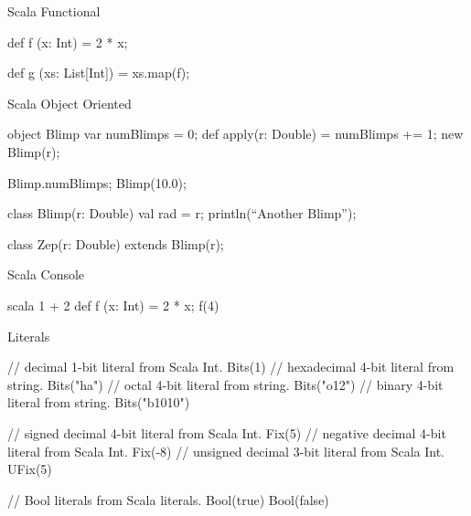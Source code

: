 \documentclass[xcolor=pdflatex,dvipsnames,table]{beamer}
\newenvironment{FramedVerb}%
{\VerbatimEnvironment
\begin{Sbox}\begin{minipage}{.94\textwidth}\begin{Verbatim}}%
{\end{Verbatim}\end{minipage}\end{Sbox}
\setlength{\fboxsep}{8pt}\fbox{\TheSbox}}
\begin{document}
\begin{frame}[fragile]{Scala Functional}

\begin{scala}
def f (x: Int) = 2 * x;

def g (xs: List[Int]) =  xs.map(f);
\end{scala}
\end{frame}

\begin{frame}{Scala Object Oriented}

\begin{scala}
object Blimp {
  var numBlimps = 0;
  def apply(r: Double) = {
    numBlimps += 1;
    new Blimp(r);
  }
}

Blimp.numBlimps;
Blimp(10.0);

class Blimp(r: Double) {
  val rad = r;
  println(“Another Blimp”);
}

class Zep(r: Double) extends Blimp(r);
\end{scala}

\end{frame}

\begin{frame}[fragile]{Scala Console}
\begin{scala}
scala
1 + 2
def f (x: Int) = 2 * x;
f(4)
\end{scala}
\end{frame}


\begin{frame}[fragile]{Literals}
\begin{scala}
// decimal 1-bit literal from Scala Int. 
Bits(1)       
// hexadecimal 4-bit literal from string.
Bits("ha")    
// octal 4-bit literal from string. 
Bits("o12")   
// binary 4-bit literal from string.
Bits("b1010") 

// signed decimal 4-bit literal from Scala Int.
Fix(5)        
// negative decimal 4-bit literal from Scala Int.
Fix(-8)       
// unsigned decimal 3-bit literal from Scala Int.
UFix(5)       

// Bool literals from Scala literals.
Bool(true)    
Bool(false)
\end{scala}
\end{frame}
 
\end{document}
